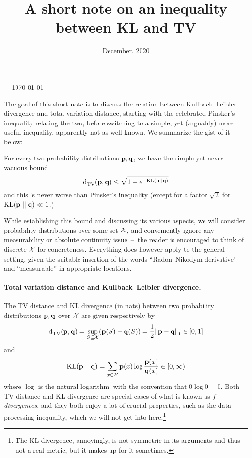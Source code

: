 \documentclass[10pt]{article}
\title{A short note on an inequality between KL and TV}
\date{December, 2020}
\begin{document}
\begin{flushleft}\sf\footnotesize
\makeatletter
\@date~- \today \hfill \@title
\makeatother
\end{flushleft}
\vspace{5mm}

The goal of this short note is to discuss the relation between Kullback--Leibler divergence and total variation distance, starting with the celebrated Pinsker's inequality relating the two, before switching to a simple, yet (arguably) more useful inequality, apparently not as well known. We summarize the gist of it below:

\begin{theorem}
  \label{theo:bh}
    For every two probability distributions $\mathbf{p},\mathbf{q}$, we have the simple yet never vacuous bound
    \begin{equation}
        \totalvardist{\p}{\q} \leq \sqrt{1-e^{-\kldiv{\p}{\q}}}
    \end{equation}
    and this is never worse than Pinsker's inequality (except for a factor $\sqrt{2}$ for $\kldiv{\p}{\q}\ll 1$.)
\end{theorem}
While establishing this bound and discussing its various aspects, we will consider probability distributions over some set $\mathcal{X}$, and conveniently ignore any measurability or absolute continuity issue~--~the reader is encouraged to think of discrete $\mathcal{X}$ for concreteness. Everything does however apply to the general setting, given the suitable insertion of the words ``Radon--Nikodym derivative'' and ``measurable'' in appropriate locations.

\paragraph{Total variation distance and Kullback--Leibler divergence.}

The TV distance and KL divergence (in nats) between two probability distributions $\mathbf{p},\mathbf{q}$ over $\mathcal{X}$ are given respectively by
\[
    \totalvardist{\p}{\q} = \sup_{S\subseteq \domain} (\p(S)-\q(S)) = \frac{1}{2}\normone{\p-\q}\in[0,1]
\]
and
\[
    \kldiv{\p}{\q}  = \sum_{x\in\domain} \p(x)\log\frac{\p(x)}{\q(x)} \in [0,\infty)
\]
where $\log$ is the natural logarithm, with the convention that $0\log 0 = 0$. Both TV distance and KL divergence are special cases of what is known as \emph{$f$-divergences}, and they both enjoy a lot of crucial properties, such as the data processing inequality, which we will not get into here.\footnote{The KL divergence, annoyingly, is not symmetric in its arguments and thus not a real metric, but it makes up for it sometimes.}
\end{document}
